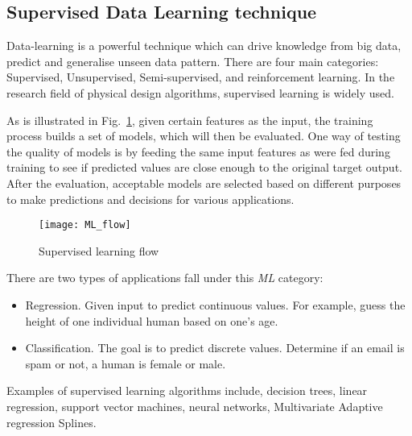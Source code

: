 \subsection{Supervised Data Learning technique}
Data-learning is a powerful technique which can drive knowledge from big data, predict and generalise unseen data pattern. There are four main categories: Supervised, Unsupervised, Semi-supervised, and reinforcement learning. In the research field of physical design algorithms, supervised learning is widely used.

As is illustrated in Fig.~\ref{fig:ml_flow}, given certain features as the input, the training process builds a set of models, which will then be evaluated. One way of testing the quality of models is by feeding the same input features as were fed during training to see if predicted values are close enough to the original target output. After the evaluation, acceptable models are selected based on different purposes to make predictions and decisions for various applications. 
\begin{figure}[htbp]
	\centerline{\texttt{[image: ML\_flow]}}
	\caption{Supervised learning flow}
	\label{fig:ml_flow}
\end{figure}
There are two types of applications fall under this \textit{ML} category:
\begin{itemize}
\item Regression. Given input to predict continuous values. For example, guess the height of one individual human based on one's age. 
\item Classification. The goal is to predict discrete values. Determine if an email is spam or not, a human is female or male. 
\end{itemize}

Examples of supervised learning algorithms include, decision trees, linear regression, support vector machines, neural networks, Multivariate Adaptive regression Splines.
